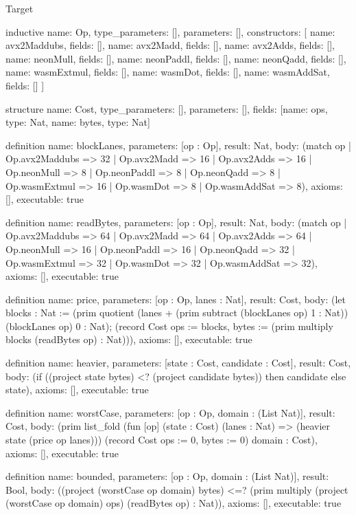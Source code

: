 \begin{lexlean}{Target}
\begin{semanticmodule}
inductive{
  name: Op,
  type_parameters: [],
  parameters: [],
  constructors: [
    {name: avx2Maddubs, fields: []},
    {name: avx2Madd, fields: []},
    {name: avx2Adds, fields: []},
    {name: neonMull, fields: []},
    {name: neonPaddl, fields: []},
    {name: neonQadd, fields: []},
    {name: wasmExtmul, fields: []},
    {name: wasmDot, fields: []},
    {name: wasmAddSat, fields: []}
  ]
}

structure{
  name: Cost,
  type_parameters: [],
  parameters: [],
  fields: [{name: ops, type: Nat}, {name: bytes, type: Nat}]
}

definition{
  name: blockLanes,
  parameters: [op : Op],
  result: Nat,
  body: (match op
    | Op.avx2Maddubs => 32
    | Op.avx2Madd => 16
    | Op.avx2Adds => 16
    | Op.neonMull => 8
    | Op.neonPaddl => 8
    | Op.neonQadd => 8
    | Op.wasmExtmul => 16
    | Op.wasmDot => 8
    | Op.wasmAddSat => 8),
  axioms: [],
  executable: true
}

definition{
  name: readBytes,
  parameters: [op : Op],
  result: Nat,
  body: (match op
    | Op.avx2Maddubs => 64
    | Op.avx2Madd => 64
    | Op.avx2Adds => 64
    | Op.neonMull => 16
    | Op.neonPaddl => 16
    | Op.neonQadd => 32
    | Op.wasmExtmul => 32
    | Op.wasmDot => 32
    | Op.wasmAddSat => 32),
  axioms: [],
  executable: true
}

definition{
  name: price,
  parameters: [op : Op, lanes : Nat],
  result: Cost,
  body: (let blocks : Nat := (prim quotient (lanes + (prim subtract (blockLanes op) 1 : Nat)) (blockLanes op) 0 : Nat); (record Cost {ops := blocks, bytes := (prim multiply blocks (readBytes op) : Nat)})),
  axioms: [],
  executable: true
}

definition{
  name: heavier,
  parameters: [state : Cost, candidate : Cost],
  result: Cost,
  body: (if ((project state bytes) <? (project candidate bytes)) then candidate else state),
  axioms: [],
  executable: true
}

definition{
  name: worstCase,
  parameters: [op : Op, domain : (List Nat)],
  result: Cost,
  body: (prim list_fold (fun [op] (state : Cost) (lanes : Nat) => (heavier state (price op lanes))) (record Cost {ops := 0, bytes := 0}) domain : Cost),
  axioms: [],
  executable: true
}

definition{
  name: bounded,
  parameters: [op : Op, domain : (List Nat)],
  result: Bool,
  body: ((project (worstCase op domain) bytes) <=? (prim multiply (project (worstCase op domain) ops) (readBytes op) : Nat)),
  axioms: [],
  executable: true
}


\end{semanticmodule}
\end{lexlean}
